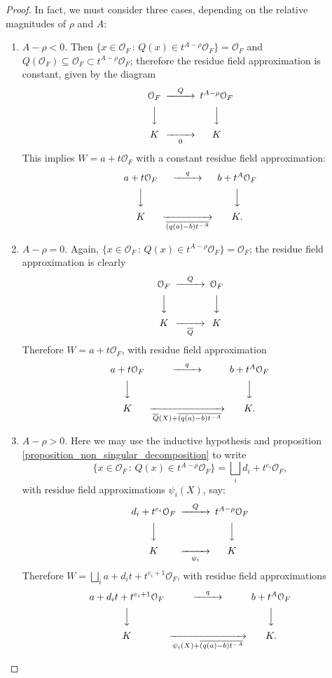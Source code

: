 \documentclass{lmsMODIFIED}
\newcommand{\roi}{\mathcal{O}}
\newcommand{\res}[1]{\overline{#1}}
\begin{document}
\begin{proof}
In fact, we must consider three cases, depending on the relative magnitudes of $\rho$ and $A$:

\begin{enumerate}
\item $A-\rho<0$. Then $\{x\in\roi_{F}\,:\,Q(x)\in t^{A-\rho}\roi_{F}\}=\roi_{F}$ and $Q(\roi_{F})\subseteq\roi_{F}\subset t^{A-\rho}\roi_{F}$; therefore the residue field approximation is constant, given by the diagram
\[\begin{CD}
\roi_{F} @>Q>> t^{A-\rho}\roi_{F} \\
@VVV  @VVV  \\
 K  @>>0>  K \\
\end{CD}\]
This implies $W=a+t\roi_{F}$ with a constant residue field approximation:
\[\begin{CD}
a+t\roi_{F} @>q>>b+t^A\roi_{F} \\
@VVV  @VVV  \\
 K  @>>\res{(q(a)-b)t^{-A}}>  K .\\
\end{CD}\]

\item $A-\rho=0$. Again, $\{x\in\roi_{F}\,:\,Q(x)\in t^{A-\rho}\roi_{F}\}=\roi_{F}$; the residue field approximation is clearly
\[\begin{CD}
\roi_{F} @>Q>>\roi_{F} \\
@VVV  @VVV  \\
 K  @>>\res{Q}>  K \\
\end{CD}\]
Therefore $W=a+t\roi_{F}$, with residue field approximation
\[\begin{CD}
a+t\roi_{F} @>q>>b+t^A\roi_{F} \\
@VVV  @VVV  \\
 K  @>>\res{Q}(X)+\res{(q(a)-b)t^{-A}}>  K .\\
\end{CD}\]

\item $A-\rho>0$. Here we may use the inductive hypothesis and proposition \ref{proposition_non_singular_decomposition} to write \[\{x\in\roi_{F}\,:\,Q(x)\in t^{A-\rho}\roi_{F}\}=\bigsqcup_i d_i+t^{e_i}\roi_{F},\] with residue field approximations $\psi_i(X)$, say:
\[\begin{CD}
d_i+t^{e_i}\roi_{F} @>Q>>t^{A-\rho}\roi_{F} \\
@VVV  @VVV  \\
 K  @>>\psi_i>  K \\
\end{CD}\]
Therefore $W=\bigsqcup_i a+d_it+t^{e_i+1}\roi_{F}$, with residue field approximations
\[\begin{CD}
a+d_it+t^{e_i+1}\roi_{F} @>q>>b+t^A\roi_{F} \\
@VVV  @VVV  \\
 K  @>>\psi_i(X)+\res{(q(a)-b)t^{-A}}>  K .\\
\end{CD}\]
\end{enumerate}
\end{proof}
\end{document}
